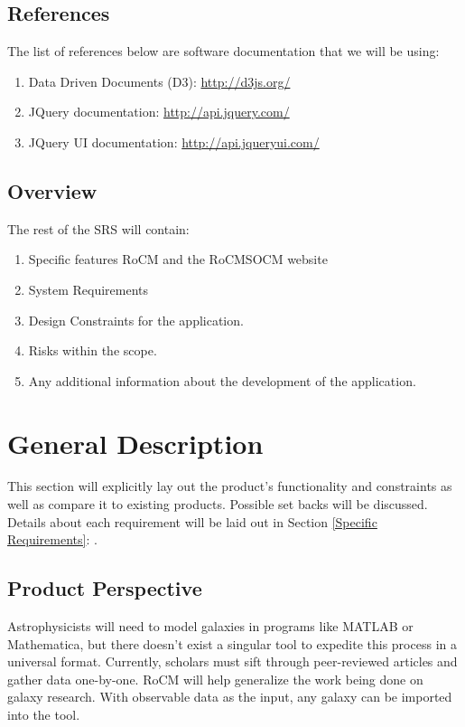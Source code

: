 \documentclass[titlepage]{article}
\begin{document}
\subsection{References}
The list of references below are software documentation that we will be using:
\begin{enumerate}
	\item Data Driven Documents (D3): \href{http://d3js.org/}{\color{blue} http://d3js.org/}
	\item JQuery documentation: \href{http://api.jquery.com/}{\color{blue} http://api.jquery.com/}
	\item JQuery UI documentation: \href{http://api.jqueryui.com/}{\color{blue} http://api.jqueryui.com/}
\end{enumerate}

\subsection{Overview}
The rest of the SRS will contain:
\begin{enumerate}
	\item Specific features RoCM and the RoCMSOCM website
	\item System Requirements
	\item Design Constraints for the application.
	\item Risks within the scope.
	\item Any additional information about the development of the application.
\end{enumerate}

\section{General Description}
This section will explicitly lay out the product's functionality and constraints as well as compare it to existing products. Possible set backs will be discussed. Details about each requirement will be laid out in Section \ref{Specific Requirements}: . 

\subsection{Product Perspective}
Astrophysicists will need to model galaxies in programs like MATLAB or Mathematica, but there doesn't exist a singular tool to expedite this process in a universal format. Currently, scholars must sift through peer-reviewed articles and gather data one-by-one. RoCM will help generalize the work being done on galaxy research.  With observable data as the input, any galaxy can be imported into the tool.
\end{document}
